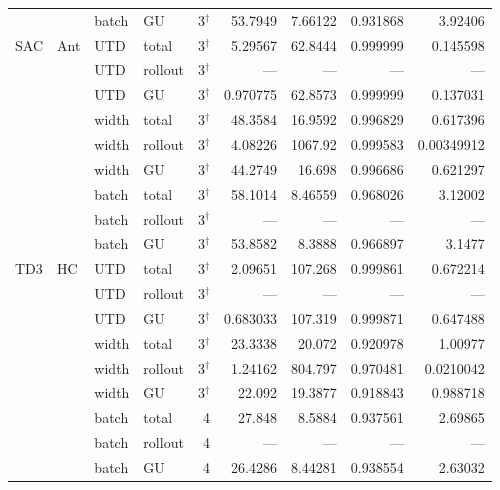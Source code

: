 {\begin{longtable}{@{}llllrrrrr@{}}
     &  & batch & GU & \num{3}$^{\dagger}$ & \num{53.7949} & \num{7.66122} & \num{0.931868} & \num{3.92406} \\
    SAC & Ant & UTD & total & \num{3}$^{\dagger}$ & \num{5.29567} & \num{62.8444} & \num{0.999999} & \num{0.145598} \\
     &  & UTD & rollout & \num{3}$^{\dagger}$ & --- & --- & --- & --- \\
     &  & UTD & GU & \num{3}$^{\dagger}$ & \num{0.970775} & \num{62.8573} & \num{0.999999} & \num{0.137031} \\
     &  & width & total & \num{3}$^{\dagger}$ & \num{48.3584} & \num{16.9592} & \num{0.996829} & \num{0.617396} \\
     &  & width & rollout & \num{3}$^{\dagger}$ & \num{4.08226} & \num{1067.92} & \num{0.999583} & \num{0.00349912} \\
     &  & width & GU & \num{3}$^{\dagger}$ & \num{44.2749} & \num{16.698} & \num{0.996686} & \num{0.621297} \\
     &  & batch & total & \num{3}$^{\dagger}$ & \num{58.1014} & \num{8.46559} & \num{0.968026} & \num{3.12002} \\
     &  & batch & rollout & \num{3}$^{\dagger}$ & --- & --- & --- & --- \\
     &  & batch & GU & \num{3}$^{\dagger}$ & \num{53.8582} & \num{8.3888} & \num{0.966897} & \num{3.1477} \\
    \midrule
    TD3 & HC & UTD & total & \num{3}$^{\dagger}$ & \num{2.09651} & \num{107.268} & \num{0.999861} & \num{0.672214} \\
     &  & UTD & rollout & \num{3}$^{\dagger}$ & --- & --- & --- & --- \\
     &  & UTD & GU & \num{3}$^{\dagger}$ & \num{0.683033} & \num{107.319} & \num{0.999871} & \num{0.647488} \\
     &  & width & total & \num{3}$^{\dagger}$ & \num{23.3338} & \num{20.072} & \num{0.920978} & \num{1.00977} \\
     &  & width & rollout & \num{3}$^{\dagger}$ & \num{1.24162} & \num{804.797} & \num{0.970481} & \num{0.0210042} \\
     &  & width & GU & \num{3}$^{\dagger}$ & \num{22.092} & \num{19.3877} & \num{0.918843} & \num{0.988718} \\
     &  & batch & total & \num{4} & \num{27.848} & \num{8.5884} & \num{0.937561} & \num{2.69865} \\
     &  & batch & rollout & \num{4} & --- & --- & --- & --- \\
     &  & batch & GU & \num{4} & \num{26.4286} & \num{8.44281} & \num{0.938554} & \num{2.63032} \\

\end{longtable}}
